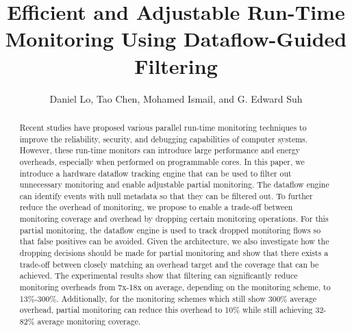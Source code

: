 \title{
Efficient and Adjustable Run-Time Monitoring Using Dataflow-Guided Filtering
}

{\author{Daniel Lo, Tao Chen, Mohamed Ismail, and G. Edward Suh}}

\date{}
\maketitle

\thispagestyle{empty}

\begin{abstract}

Recent studies have proposed various parallel run-time monitoring techniques to
improve the reliability, security, and debugging capabilities of computer
systems. However, these run-time monitors can introduce large performance and energy
overheads, especially when performed on programmable cores.
In this paper, we introduce a hardware dataflow tracking engine that can be
used to filter out unnecessary monitoring and enable adjustable partial monitoring.
The dataflow engine can identify events with null metadata so that they can
be filtered out. To further reduce the overhead of monitoring, we propose
to enable a trade-off between monitoring coverage and overhead by dropping certain
monitoring operations. For this partial monitoring, the dataflow engine is used
to track dropped monitoring flows so that false positives can be avoided.
Given the architecture, we also investigate how the dropping decisions should be
made for partial monitoring and show that there exists a trade-off between closely
matching an overhead target and the coverage that can be achieved.
The experimental results show that filtering can significantly reduce monitoring
overheads from 7x-18x on average, depending on the monitoring scheme, to
13\%-300\%. Additionally, for the monitoring schemes which still show 300\%
average overhead, partial monitoring can reduce this overhead to 10\% while
still achieving 32-82\% average monitoring coverage. 

\end{abstract}
